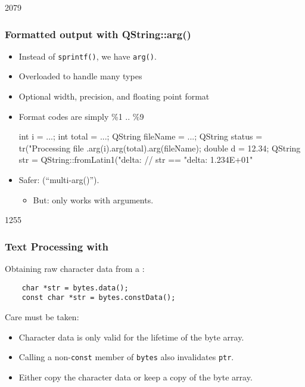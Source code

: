 \begin{slide}[fragile]{2079}
\frametitle{Formatted output with QString::arg()}
\begin{itemize}
\item Instead of \texttt{sprintf()}, we have \texttt{arg()}.
\item Overloaded to handle many types
\item Optional width, precision, and floating point format 
\item Format codes are simply \%1 .. \%9
\begin{cpp}
int i = ...;
int total = ...;
QString fileName = ...;
QString status = tr("Processing file %
                .arg(i).arg(total).arg(fileName);
double d = 12.34;
QString str = QString::fromLatin1("delta: %
// str == "delta: 1.234E+01"               
\end{cpp}

\item Safer:  (``multi-arg()'').
  \begin{itemize}
  \item But: only works with  arguments.
  \end{itemize}
\end{itemize}
\end{slide}

\begin{slide}[fragile]{1255}\frametitle{Text Processing with }
  Obtaining raw character data from a :
  
  \begin{lstlisting}
    char *str = bytes.data();
    const char *str = bytes.constData();
  \end{lstlisting}
  
  Care must be taken:
  \begin{itemize}
  \item Character data is only valid for the lifetime of the byte array.
  \item Calling a non-\texttt{const} member of \texttt{bytes} also invalidates \texttt{ptr}.
  \item Either copy the character data or keep a copy of the byte array.
  \end{itemize}
\end{slide}

